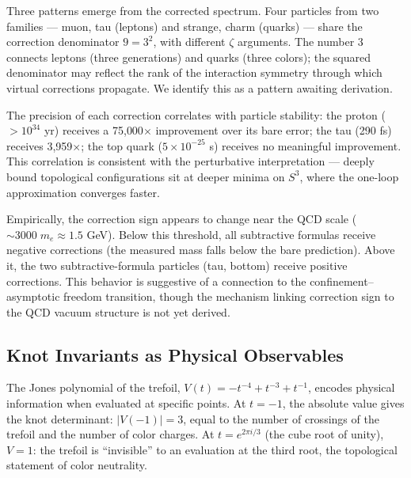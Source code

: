 Three patterns emerge from the corrected spectrum. Four particles from two families --- muon, tau (leptons) and strange, charm (quarks) --- share the correction denominator $9 = 3^2$, with different $\zeta$ arguments. The number 3 connects leptons (three generations) and quarks (three colors); the squared denominator may reflect the rank of the interaction symmetry through which virtual corrections propagate. We identify this as a pattern awaiting derivation.

The precision of each correction correlates with particle stability: the proton ($> 10^{34}$ yr) receives a 75{,}000$\times$ improvement over its bare error; the tau (290 fs) receives 3{,}959$\times$; the top quark ($5 \times 10^{-25}$ s) receives no meaningful improvement. This correlation is consistent with the perturbative interpretation --- deeply bound topological configurations sit at deeper minima on $S^3$, where the one-loop approximation converges faster.

Empirically, the correction sign appears to change near the QCD scale ($\sim 3000 \; m_e \approx 1.5$ GeV). Below this threshold, all subtractive formulas receive negative corrections (the measured mass falls below the bare prediction). Above it, the two subtractive-formula particles (tau, bottom) receive positive corrections. This behavior is suggestive of a connection to the confinement--asymptotic freedom transition, though the mechanism linking correction sign to the QCD vacuum structure is not yet derived.



\subsection{Knot Invariants as Physical Observables}

The Jones polynomial of the trefoil, $V(t) = -t^{-4} + t^{-3} + t^{-1}$, encodes physical information when evaluated at specific points. At $t = -1$, the absolute value gives the knot determinant: $|V(-1)| = 3$, equal to the number of crossings of the trefoil and the number of color charges. At $t = e^{2\pi i/3}$ (the cube root of unity), $V = 1$: the trefoil is ``invisible'' to an evaluation at the third root, the topological statement of color neutrality.

